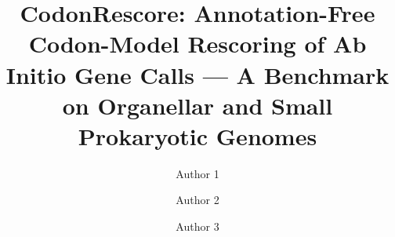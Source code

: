 \documentclass[runningheads]{llncs}
\begin{document}
\title{CodonRescore: Annotation-Free Codon-Model Rescoring of Ab Initio Gene Calls --- A Benchmark on Organellar and Small Prokaryotic Genomes}
\author{Author 1 \and Author 2 \and Author 3}
\maketitle

\end{document}
